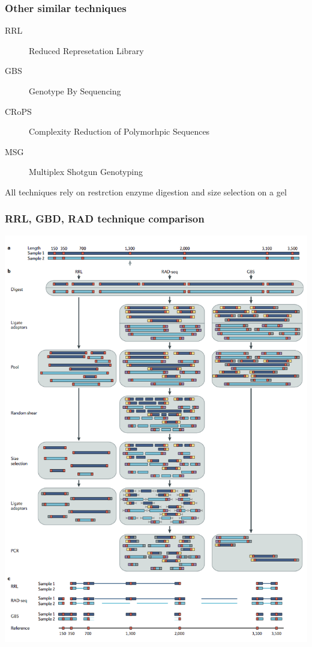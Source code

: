 \documentclass[pdf]{beamer}
\begin{document}
\begin{frame}
\frametitle{Other similar techniques}
\begin{description}
\item[RRL] Reduced Represetation Library
\item[GBS] Genotype By Sequencing 
\item[CRoPS] Complexity Reduction of Polymorhpic Sequences
\item[MSG] Multiplex Shotgun Genotyping
\end{description}
All techniques rely on restrction enzyme digestion and size selection on a gel
\end{frame}

\begin{frame}
\frametitle{RRL, GBD, RAD technique comparison}
\begin{center}
\includegraphics[scale=0.20]{Figures/comparison.png} 
\end{center}
\end{frame}
\end{document}
